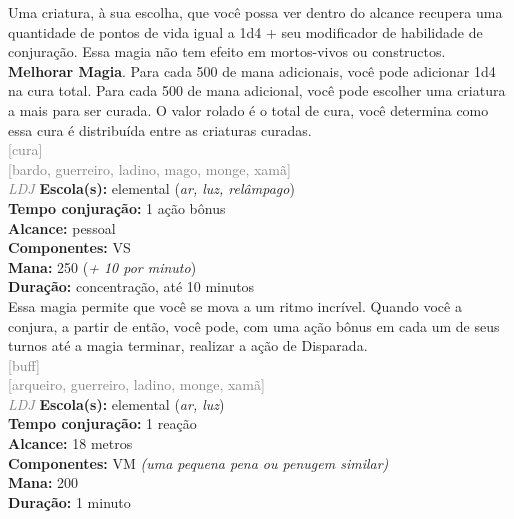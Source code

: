 \documentclass{RPG_Adventure}[2021/10/20]
\begin{document}
{\normalsize Uma criatura, à sua escolha, que você possa ver dentro do alcance recupera uma quantidade de pontos de vida igual a 1d4 + seu modificador de habilidade de conjuração. Essa magia não tem efeito em mortos-vivos ou constructos.\\\t \textbf{Melhorar Magia}. Para cada 500 de mana adicionais, você pode adicionar 1d4 na cura total. Para cada 500 de mana adicional, você pode escolher uma criatura a mais para ser curada. O valor rolado é o total de cura, você determina como essa cura é distribuída entre as criaturas curadas.\\}
{\scriptsize \textcolor{gray}{[cura]\\}}
{\scriptsize \textcolor{gray}{[bardo, guerreiro, ladino, mago, monge, xamã]\\}}
{\tiny \textcolor{gray}{\textit{LDJ}}}\jump{}
{\small \t \textbf{Escola(s):} elemental (\textit{ar, luz, relâmpago})\\\t \textbf{Tempo conjuração:} 1 ação bônus\\\t \textbf{Alcance:} pessoal\\\t \textbf{Componentes:} VS\\\t \textbf{Mana:} 250 (\textit{+ 10 por minuto})\\\t \textbf{Duração:} concentração, até 10 minutos\\}
{\normalsize Essa magia permite que você se mova a um ritmo incrível. Quando você a conjura, a partir de então, você pode, com uma ação bônus em cada um de seus turnos até a magia terminar, realizar a ação de Disparada.\\}
{\scriptsize \textcolor{gray}{[buff]\\}}
{\scriptsize \textcolor{gray}{[arqueiro, guerreiro, ladino, monge, xamã]\\}}
{\tiny \textcolor{gray}{\textit{LDJ}}}\jump{}
{\small \t \textbf{Escola(s):} elemental (\textit{ar, luz})\\\t \textbf{Tempo conjuração:} 1 reação\\\t \textbf{Alcance:} 18 metros\\\t \textbf{Componentes:} VM \textit{(uma pequena pena ou penugem similar)}\\\t \textbf{Mana:} 200\\\t \textbf{Duração:} 1 minuto\\}
\end{document}
